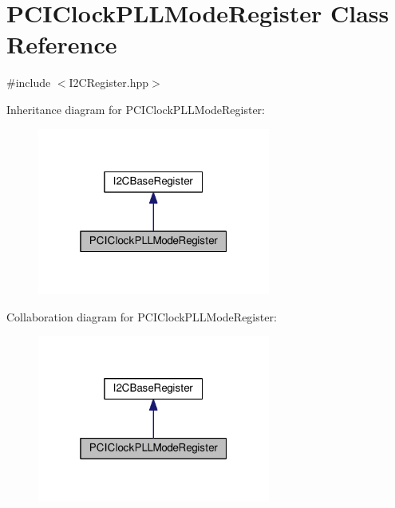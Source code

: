 \hypertarget{class_p_c_i_clock_p_l_l_mode_register}{}\section{P\+C\+I\+Clock\+P\+L\+L\+Mode\+Register Class Reference}
\label{class_p_c_i_clock_p_l_l_mode_register}


{\ttfamily \#include $<$I2\+C\+Register.\+hpp$>$}



Inheritance diagram for P\+C\+I\+Clock\+P\+L\+L\+Mode\+Register\+:\nopagebreak
\begin{figure}[H]
\begin{center}
\leavevmode
\includegraphics[width=217pt]{class_p_c_i_clock_p_l_l_mode_register__inherit__graph}
\end{center}
\end{figure}


Collaboration diagram for P\+C\+I\+Clock\+P\+L\+L\+Mode\+Register\+:\nopagebreak
\begin{figure}[H]
\begin{center}
\leavevmode
\includegraphics[width=217pt]{class_p_c_i_clock_p_l_l_mode_register__coll__graph}
\end{center}
\end{figure}
